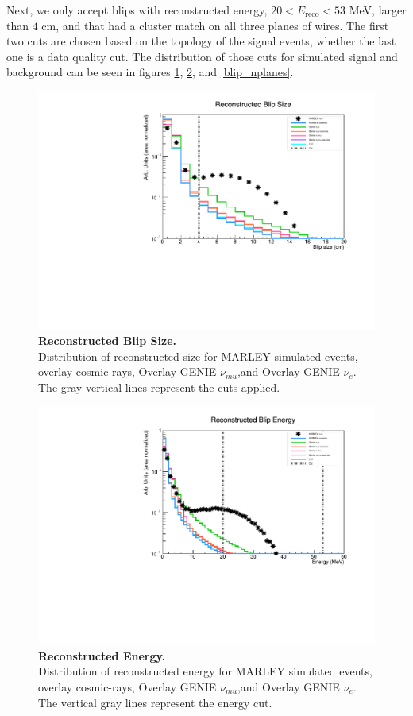 Next, we only accept blips with reconstructed energy, $20 < E_\text{reco} < 53$ MeV, larger than $4$ cm, and that had a cluster match on all three planes of wires. The first two cuts are chosen based on the topology of the signal events, whether the last one is a data quality cut.
The distribution of those cuts for simulated signal and background can be seen in figures \ref{blip_size}, \ref{blip_energy}, and \ref{blip_nplanes}.

\begin{figure}[h!]
    \centering
    \includegraphics[width=120mm]{Figures/blip_size.pdf}
    \caption[Reconstructed Blip Size.]{{\textbf{Reconstructed Blip Size.}}\\ Distribution of reconstructed size for MARLEY simulated events, overlay cosmic-rays, Overlay GENIE $\nu_{mu}$,and Overlay GENIE $\nu_{e}$. The gray vertical lines represent the cuts applied.}
 \label{blip_size}
\end{figure}

\begin{figure}[h!]
    \centering
    \includegraphics[width=120mm]{Figures/Energy_MC.pdf}
    \caption[Reconstructed Energy.]{{\textbf{Reconstructed Energy.}}\\ Distribution of reconstructed energy for MARLEY simulated events, overlay cosmic-rays, Overlay GENIE $\nu_{mu}$,and Overlay GENIE $\nu_{e}$. The vertical gray lines represent the energy cut.}
 \label{blip_energy}
\end{figure}

